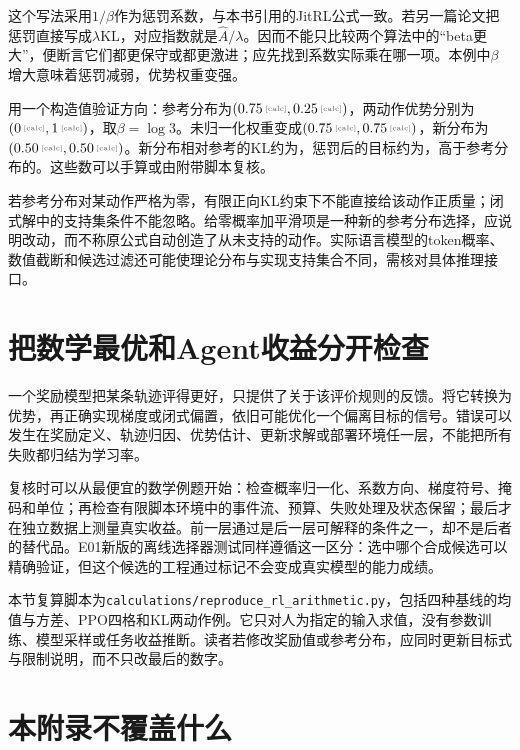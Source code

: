 这个写法采用$1/\beta$作为惩罚系数，与本书引用的JitRL公式一致\cite{jitrl-2601}。若另一篇论文把惩罚直接写成$\lambda\mathrm{KL}$，对应指数就是$\widehat A/\lambda$。因而不能只比较两个算法中的“beta更大”，便断言它们都更保守或都更激进；应先找到系数实际乘在哪一项。本例中$\beta$增大意味着惩罚减弱，优势权重变强。

用一个构造值验证方向：参考分布为$(\calcnum{0.75},\calcnum{0.25})$，两动作优势分别为$(\calcnum{0},\calcnum{1})$，取$\beta=\log 3$。未归一化权重变成$(\calcnum{0.75},\calcnum{0.75})$，新分布为$(\calcnum{0.50},\calcnum{0.50})$。新分布相对参考的KL约为，惩罚后的目标约为，高于参考分布的。这些数可以手算或由附带脚本复核。

若参考分布对某动作严格为零，有限正向KL约束下不能直接给该动作正质量；闭式解中的支持集条件不能忽略。给零概率加平滑项是一种新的参考分布选择，应说明改动，而不称原公式自动创造了从未支持的动作。实际语言模型的token概率、数值截断和候选过滤还可能使理论分布与实现支持集合不同，需核对具体推理接口。

\section{把数学最优和Agent收益分开检查}

一个奖励模型把某条轨迹评得更好，只提供了关于该评价规则的反馈。将它转换为优势，再正确实现梯度或闭式偏置，依旧可能优化一个偏离目标的信号。错误可以发生在奖励定义、轨迹归因、优势估计、更新求解或部署环境任一层，不能把所有失败都归结为学习率。

复核时可以从最便宜的数学例题开始：检查概率归一化、系数方向、梯度符号、掩码和单位；再检查有限脚本环境中的事件流、预算、失败处理及状态保留；最后才在独立数据上测量真实收益。前一层通过是后一层可解释的条件之一，却不是后者的替代品。E01新版的离线选择器测试同样遵循这一区分：选中哪个合成候选可以精确验证，但这个候选的工程通过标记不会变成真实模型的能力成绩。

\begin{sloppypar}
本节复算脚本为\texttt{calculations/reproduce\_rl\_arithmetic.py}，包括四种基线的均值与方差、PPO四格和KL两动作例。它只对人为指定的输入求值，没有参数训练、模型采样或任务收益推断。读者若修改奖励值或参考分布，应同时更新目标式与限制说明，而不只改最后的数字。
\end{sloppypar}

\section{本附录不覆盖什么}
\label{sec:appc-limits}

